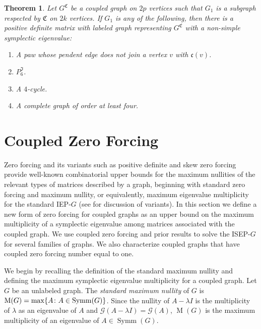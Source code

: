 \documentclass[12pt]{article}
\newtheorem{thm}{Theorem}[section]
\theoremstyle{definition}
\theoremstyle{definition}
\theoremstyle{definition}
\numberwithin{figure}{section}
\numberwithin{equation}{section}
\newcommand{\GC}[2]{#1 ^ {\mathfrak #2}}
\newcommand{\PP}{\mathfrak{C}}
\newcommand{\II}{\mathfrak{I}}
\newcommand{\G}{\mathcal{G}}
\newcommand{\symm}{\operatorname{Symm}}
\newcommand{\M}{\operatorname{M}}
\newcommand{\lam}{\lambda}
\newcommand{\ben}{\begin{enumerate}}
\newcommand{\een}{\end{enumerate}}
\begin{document}
\begin{thm}\label{forbid4simple}
 Let $\GC G C$ be a coupled graph on $2p$ vertices such that 
 $G_1$ is a subgraph respected by $\PP$ on $2k$ vertices. 
 If $G_1$ is any of the following, then there is a positive definite matrix
  with labeled graph  representing $\GC GC$ with a non-simple symplectic eigenvalue: 

\ben[\rm $(a)$]
\item A paw whose pendent edge does not join a vertex $v$ with $\mathfrak{c}({v})$.
\item $P_6^{\II}$.
\item A $4$-cycle.
\item A complete graph of order at least four.
\een 
\end{thm}


\section{Coupled Zero Forcing}
\label{s:zeroforcing}

 Zero forcing and its variants such as positive definite and skew zero forcing  provide well-known  combinatorial upper bounds for the 
maximum nullities of the relevant types of  matrices described by  {a} graph, beginning with standard zero forcing  and {maximum nullity, or equivalently, maximum eigenvalue multiplicity for the standard} IEP-$G$ \cite{AIM08}  
(see  \cite[Chapter 9]{HLSbook} for discussion of variants).   In this section we define a new form of zero forcing for coupled graphs as an upper bound on the maximum multiplicity of a symplectic eigenvalue among matrices associated with the coupled graph.  We use coupled zero forcing and prior results to solve the ISEP-$G$ for several families of graphs. We also characterize coupled graphs that have coupled zero forcing number equal to one.


We begin by recalling the definition of the standard maximum nullity  and defining the maximum symplectic eigenvalue multiplicity   for a coupled graph.
Let $G$ be an unlabeled graph. The \emph{standard maximum nullity} of $G$ is $\M(G)=\max\{\null A \colon A\in\symm(G)\}$.
Since the nullity of $A-\lam I$ is the multiplicity of $\lam$ as an eigenvalue of $A$ and $\G(A-\lam I)=\G(A)$, $\M(G)$ is the maximum multiplicity of an eigenvalue of $A\in\symm(G)$.
\end{document}
